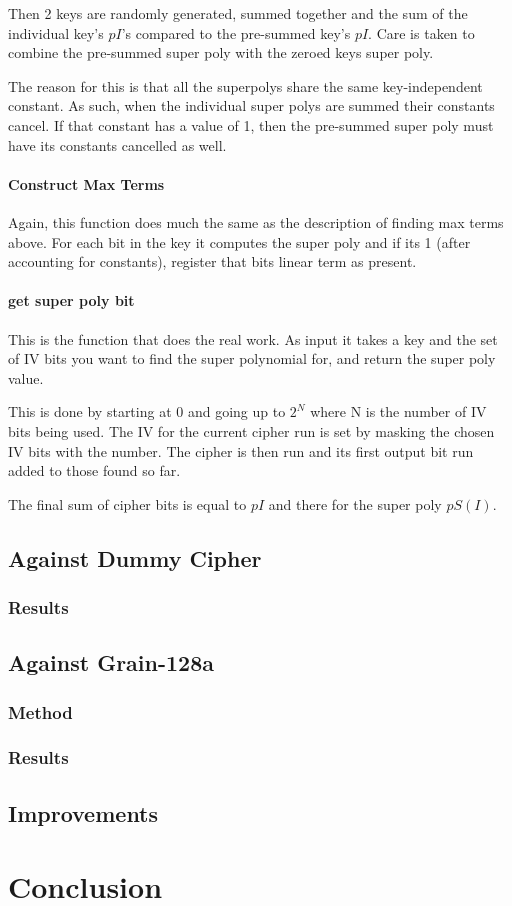 \documentclass{report}
\begin{document}
Then 2 keys are randomly generated, summed together and the sum of the individual key's $pI$'s compared to the pre-summed key's $pI$. Care is taken to combine the pre-summed super poly with the zeroed keys super poly.

The reason for this is that all the superpolys share the same key-independent constant. As such, when the individual super polys are summed their constants cancel. If that constant has a value of 1, then the pre-summed super poly must have its constants cancelled as well.

\subsubsection{Construct Max Terms}
Again, this function does much the same as the description of finding max terms above. For each bit in the key it computes the super poly and if its 1 (after accounting for constants), register that bits linear term as present.
\subsubsection{get super poly bit}
This is the function that does the real work. As input it takes a key and the set of IV bits you want to find the super polynomial for, and return the super poly value.

This is done by starting at 0 and going up to $2^N$ where N is the number of IV bits being used. The IV for the current cipher run is set by masking the chosen IV bits with the number. The cipher is then run and its first output bit run added to those found so far.

The final sum of cipher bits is equal to $pI$ and there for the super poly $pS(I)$.
\section{Against Dummy Cipher}
\subsection{Results}
\section{Against Grain-128a}
\subsection{Method}
\subsection{Results}
\section{Improvements}
\chapter{Conclusion}


\end{document}
